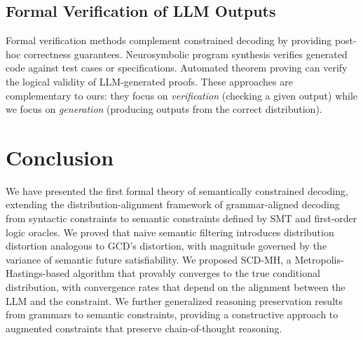 \documentclass[twoside,11pt]{article}
\begin{document}
\subsection{Formal Verification of LLM Outputs}
\label{sec:related-verification}

Formal verification methods complement constrained decoding by providing
post-hoc correctness guarantees. Neurosymbolic program synthesis
\citep{chen2021evaluating} verifies generated code against test cases or
specifications. Automated theorem proving can verify the logical validity of
LLM-generated proofs. These approaches are complementary to ours: they focus
on \emph{verification} (checking a given output) while we focus on
\emph{generation} (producing outputs from the correct distribution).

\section{Conclusion}
\label{sec:conclusion}

We have presented the first formal theory of semantically constrained
decoding, extending the distribution-alignment framework of grammar-aligned
decoding from syntactic constraints to semantic constraints defined by SMT
and first-order logic oracles. We proved that naive semantic filtering
introduces distribution distortion analogous to GCD's distortion, with
magnitude governed by the variance of semantic future satisfiability. We
proposed SCD-MH, a Metropolis-Hastings-based algorithm that provably
converges to the true conditional distribution, with convergence rates that
depend on the alignment between the LLM and the constraint. We further
generalized reasoning preservation results from grammars to semantic
constraints, providing a constructive approach to augmented constraints that
preserve chain-of-thought reasoning.
\end{document}
